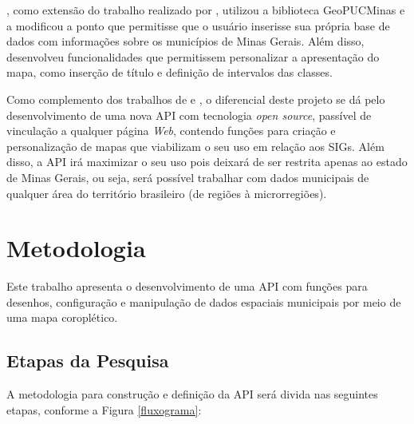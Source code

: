 \documentclass[12pt]{article}
\begin{document}
\citet{magno}, como extensão do trabalho realizado por \citet{kutova}, utilizou a biblioteca GeoPUCMinas e a modificou a ponto que permitisse que o usuário inserisse sua própria base de dados com informações sobre os municípios de Minas Gerais. Além disso, desenvolveu funcionalidades que permitissem personalizar a apresentação do mapa, como inserção de título e definição de intervalos das classes.

Como complemento dos trabalhos de \citet{kutova} e \citet{magno}, o diferencial deste projeto se dá pelo desenvolvimento de uma nova API com tecnologia \emph{open source}, passível de vinculação a qualquer página \emph{Web}, contendo funções para criação e personalização de mapas que viabilizam o seu uso em relação aos SIGs. Além disso, a API irá maximizar o seu uso pois deixará de ser restrita apenas ao estado de Minas Gerais, ou seja, será possível trabalhar com dados municipais de qualquer área do território brasileiro (de regiões à microrregiões). %

\section{Metodologia} \label{metodologia}

Este trabalho apresenta o desenvolvimento de uma API com funções para desenhos, configuração e manipulação de dados espaciais municipais por meio de uma mapa coroplético.

\subsection{Etapas da Pesquisa} \label{atividades}

A metodologia para construção e definição da API será divida nas seguintes etapas, conforme a Figura \ref{fluxograma}:
\end{document}
